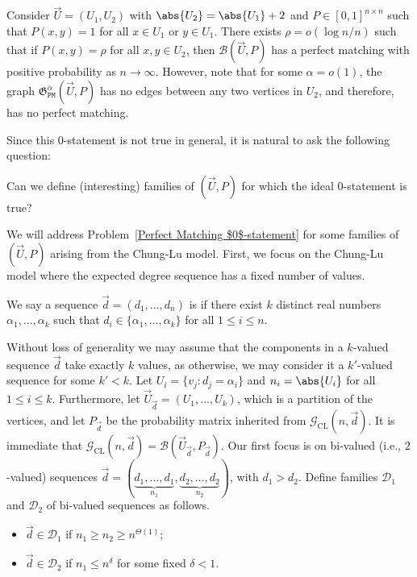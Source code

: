 \documentclass[12pt]{article}
\begin{document}
\begin{example}
\label{example: SBM Ideal 0-statement Counterexample}
Consider $\vec{U} = (U_1, U_2)$ with $\abs{U_2} = \abs{U_1}+2$ and $P\in [0,1]^{n\times n}$ such that $P(x,y) = 1$ for all $x\in U_1$ or $y\in U_1$. There exists $\rho = o(\log n/n)$ such that if $P(x,y) = \rho$ for all $x,y\in U_2$, then $\mathcal{B}(\vec{U}, P)$ has a perfect matching with positive probability as $n\rightarrow\infty$. However, note that for some $\alpha = o(1)$, the graph $\mathfrak{G}_{\texttt{PM}}^{\alpha} (\vec{U}, P)$ has no edges between any two vertices in $U_2$, and therefore, has no perfect matching.
\end{example}


Since this $0$-statement is not true in general, it is natural to ask the following question:
\begin{problem}
\label{Perfect Matching $0$-statement}
Can we define (interesting) families of $(\vec{U},P)$ for which the ideal 0-statement is true?
\end{problem}

We will address Problem~\ref{Perfect Matching $0$-statement} for some families of $(\vec{U},P)$ arising from the Chung-Lu model. First, we focus on the Chung-Lu model where the expected degree sequence has a fixed number of values.

\begin{definition}
\label{defn: U and P for Chung-Lu}
We say a sequence $\vec{d} = (d_1,\ldots, d_n)$ is  if there exist $k$ distinct real numbers $\alpha_1,\ldots,\alpha_k$ such that $d_i\in \{\alpha_1,\ldots,\alpha_k\}$ for all $1\le i\le n$.
\end{definition}

Without loss of generality we may assume that the components in a $k$-valued sequence $\vec{d}$ take exactly $k$ values, as otherwise, we may consider it a $k'$-valued sequence for some $k'<k$.
Let $U_i = \{v_j: d_j = \alpha_i\}$ and $n_i = \abs{U_i}$ for all $1\leq i\leq k$. 
Furthermore, let $\vec{U}_{\vec{d}} = \left(U_1,\ldots,U_k\right)$,  which is a partition of the vertices, and let $P_{\vec{d}}$ be the probability matrix inherited from $\mathcal{G}_{\text{CL}}(n, \vec{d})$. It is immediate that $\mathcal{G}_{\text{CL}}(n, \vec{d}) = \mathcal{B}(\vec{U}_{\vec{d}}, P_{\vec{d}})$. Our first focus is on bi-valued (i.e., $2$-valued) sequences $\vec{d} = (\underbrace{d_1,\ldots, d_1}_{n_1}, \underbrace{d_2,\ldots, d_2}_{n_2})$, with $d_1> d_2$. Define families $\mathcal{D}_1$ and $\mathcal{D}_2$ of bi-valued sequences as follows. 
\begin{itemize}
    \item $\vec{d}\in\mathcal{D}_1$ if $n_1\geq n_2 \ge n^{\Theta(1)}$;
    \item $\vec{d}\in\mathcal{D}_2$ if $n_1\leq n^{\delta}$ for some fixed $\delta < 1$.
\end{itemize}
\end{document}

